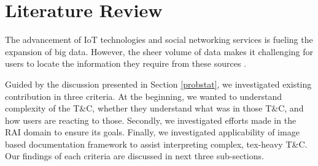 \documentclass[manuscript,review,anonymous]{acmart}
\begin{document}




\section{Literature Review}\label{liturea_review}

	The advancement of IoT technologies and social networking services is fueling the expansion of big data. However, the sheer volume of data makes it challenging for users to locate the information they require from these sources \cite{Hyun2022}.

	Guided by the discussion presented in Section \ref{probstat}, we investigated existing contribution in three criteria. At the beginning, we wanted to understand complexity of the T\&C, whether they understand what was in those T\&C, and how users are reacting to those. Secondly, we investigated efforts made in the RAI domain to ensure its goals. Finally, we investigated applicability of image based documentation framework to assist interpreting complex, tex-heavy T\&C. Our findings of each criteria are discussed in next three sub-sections.
\end{document}
